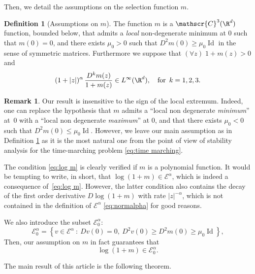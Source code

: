 \documentclass[10pt]{amsart}
\let\mathcal\mathscr
\newcommand{\cC}{\mathcal{C}}
\theoremstyle{plain}
\theoremstyle{definition}
\newtheorem{definition}[thm]{Definition}
\newtheorem{remark}[thm]{Remark}
\newcommand{\abs}[1]{\left\lvert#1\right\rvert}
\newcommand{\Ea}{\mathcal{E}^\alpha}
\newcommand{\Eaz}{\mathcal{E}^\alpha_0}
\DeclareMathOperator{\Id}{Id}
\begin{document}
Then, we detail the assumptions on the selection function $m$.
\begin{definition}[Assumptions on $m$]\label{def m}
The function $m$ is a $\cC^3(\R^d)$ function, bounded below, that admits a \emph{local} non-degenerate minimum at $0$ such that $m(0)=0$, and there exists $\mu_0>0$ such that $D^2 m(0) \geq \mu_0 \Id$ in the sense of symmetric matrices.
Furthermore we suppose that $(\forall z)\; 1+m(z) > 0$ and
\begin{equation}\label{eq:log m}
(1+\abs{z})^\alpha\, \dfrac{D^k m(z)}{1+m(z)} \in L^\infty(\R^d), \quad \text{for\, $k = 1,2,3$}.
\end{equation}
\end{definition}
\begin{remark}\label{rem:SM} Our result is insensitive to the sign of the local extremum. Indeed, one can replace the hypothesis that $m$ admits a ``local non degenerate \emph{minimum}'' at~$0$ with a ``local non degenerate \emph{maximum}'' at 0, and that there exists $\mu_0 <0$ such that $ D^2 m(0) \leq \mu_0 \Id$. However, we leave our main assumption as in Definition \ref{def m} as it is the most natural one from the point of view of stability analysis for the time-marching problem \eqref{eq:time marching}.
\end{remark}
The condition \eqref{eq:log m} is clearly verified if $m$ is a polynomial function. It would be tempting to write, in short, that $\log(1+m)\in \Ea$, which is indeed a consequence of~\eqref{eq:log m}. However, the latter condition also contains the decay of the first order deri\-va\-tive $D\log(1+m)$ with rate $|z|^{-\alpha}$, which is not contained in the definition of $\Ea$ \eqref{eq:normalpha} for good reasons.

We also introduce the subset $\Eaz$:
\begin{equation}\label{eq:E0}
\Eaz = \left\{ v \in \Ea\::\: D v(0)=0, \ D^2 v(0) \geq D^2 m(0) \geq \mu_0 \Id \right\},
\end{equation}
Then, our assumption on $m$ in fact guarantees	 that
\begin{equation}\label{cond logm inEaz}
\log(1+m) \in \Eaz.
\end{equation}
	

The main result of this article is the following theorem.
\skpt
\end{document}
